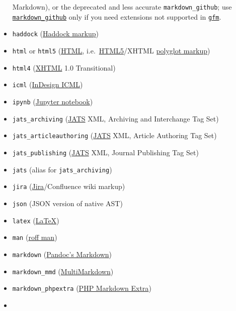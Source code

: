 \documentclass[
  a4paper,
]{article}
\begin{document}
\begin{description}
\begin{itemize}
{  Markdown}), or the deprecated and less accurate
  \texttt{markdown\_github}; use
  \protect\hyperlink{markdown-variants}{\texttt{markdown\_github}} only
  if you need extensions not supported in
  \protect\hyperlink{markdown-variants}{\texttt{gfm}}.
\item
  \texttt{haddock}
  (\href{https://www.haskell.org/haddock/doc/html/ch03s08.html}{Haddock
  markup})
\item
  \texttt{html} or \texttt{html5}
  (\href{https://www.w3.org/html/}{HTML},
  i.e.~\href{https://html.spec.whatwg.org/}{HTML5}/XHTML
  \href{https://www.w3.org/TR/html-polyglot/}{polyglot markup})
\item
  \texttt{html4} (\href{https://www.w3.org/TR/xhtml1/}{XHTML} 1.0
  Transitional)
\item
  \texttt{icml}
  (\href{https://wwwimages.adobe.com/www.adobe.com/content/dam/acom/en/devnet/indesign/sdk/cs6/idml/idml-cookbook.pdf}{InDesign
  ICML})
\item
  \texttt{ipynb}
  (\href{https://nbformat.readthedocs.io/en/latest/}{Jupyter notebook})
\item
  \texttt{jats\_archiving} (\href{https://jats.nlm.nih.gov}{JATS} XML,
  Archiving and Interchange Tag Set)
\item
  \texttt{jats\_articleauthoring} (\href{https://jats.nlm.nih.gov}{JATS}
  XML, Article Authoring Tag Set)
\item
  \texttt{jats\_publishing} (\href{https://jats.nlm.nih.gov}{JATS} XML,
  Journal Publishing Tag Set)
\item
  \texttt{jats} (alias for \texttt{jats\_archiving})
\item
  \texttt{jira}
  (\href{https://jira.atlassian.com/secure/WikiRendererHelpAction.jspa?section=all}{Jira}/Confluence
  wiki markup)
\item
  \texttt{json} (JSON version of native AST)
\item
  \texttt{latex} (\href{https://www.latex-project.org/}{LaTeX})
\item
  \texttt{man} (\href{https://man.cx/groff_man(7)}{roff man})
\item
  \texttt{markdown} (\protect\hyperlink{pandocs-markdown}{Pandoc's
  Markdown})
\item
  \texttt{markdown\_mmd}
  (\href{https://fletcherpenney.net/multimarkdown/}{MultiMarkdown})
\item
  \texttt{markdown\_phpextra}
  (\href{https://michelf.ca/projects/php-markdown/extra/}{PHP Markdown
  Extra})
\item

\end{itemize}
\end{description}
\end{document}
